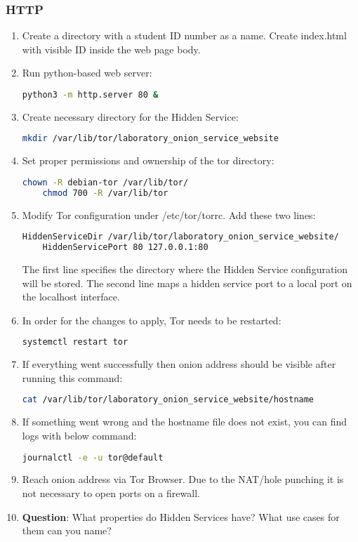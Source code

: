 \subsubsection{HTTP}
\begin{enumerate}
    \item Create a directory with a student ID number as a name. Create index.html with visible ID inside the web page body.
    \item Run python-based web server:
    \begin{lstlisting}[language=bash]
    python3 -m http.server 80 &
    \end{lstlisting}
    \item Create necessary directory for the Hidden Service:
    \begin{lstlisting}[language=bash]
    mkdir /var/lib/tor/laboratory_onion_service_website
    \end{lstlisting}
    \item Set proper permissions and ownership of the tor directory:
    \begin{lstlisting}[language=bash]
    chown -R debian-tor /var/lib/tor/
    chmod 700 -R /var/lib/tor
    \end{lstlisting}
    \item Modify Tor configuration under /etc/tor/torrc. Add these two lines:
    \begin{lstlisting}[language=bash]
    HiddenServiceDir /var/lib/tor/laboratory_onion_service_website/
    HiddenServicePort 80 127.0.0.1:80
    \end{lstlisting}
    The first line specifies the directory where the Hidden Service configuration will be stored. The second line maps a hidden service port to a local port on the localhost interface.
    \item In order for the changes to apply, Tor needs to be restarted:
    \begin{lstlisting}[language=bash]
    systemctl restart tor
    \end{lstlisting}
    \item If everything went successfully then onion address should be visible after running this command:
    \begin{lstlisting}[language=bash]
    cat /var/lib/tor/laboratory_onion_service_website/hostname
    \end{lstlisting}
    \item If something went wrong and the hostname file does not exist, you can find logs with below command:
    \begin{lstlisting}[language=bash]
    journalctl -e -u tor@default
    \end{lstlisting}
    \item Reach onion address via Tor Browser. Due to the NAT/hole punching it is not necessary to open ports on a firewall.
    \item \textbf{Question}: What properties do Hidden Services have? What use cases for them can you name?
\end{enumerate}

